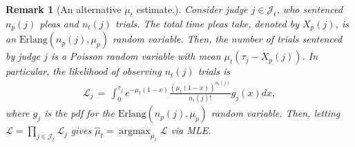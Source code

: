 \documentclass[11pt, oneside]{article}   	%
\theoremstyle{ModifiedStyle}
\newtheorem{remark}{Remark}
\newcommand{\Blue}[1]{\textcolor{blue}{#1}}
\DeclareMathOperator*{\argmax}{argmax}
\begin{document}

\begin{remark}[An alternative $\mu_t$ estimate.]
	Consider judge $j\in\mathcal{J}_t$, who sentenced $n_p(j)$ pleas and $n_t(j)$ trials. The total time pleas take, denoted by $X_p(j)$, is an $\text{Erlang}(n_p(j),\mu_p)$ random variable. Then, the number of trials sentenced by judge $j$ is a Poisson random variable with mean $\mu_t(\tau_j-X_p(j))$. In particular, the likelihood of observing $n_t(j)$ trials is 
	\begin{align*}
		\mathscr{L}_j \,=\, \int_0^{\tau_j} e^{-\mu_t(1-x)} \frac{(\mu_t(1-x))^{n_t(j)}}{n_t(j)!} g_j(x) dx,
	\end{align*} 
	where $g_j$ is the pdf for the $\text{Erlang}(n_p(j),\mu_p)$ random variable. Then, letting $\mathscr{L}=\prod_{j\in\mathcal{J}_t} \mathscr{L}_j$ gives $\hat{\mu}_t=\argmax_{\mu_t} \mathscr{L}$ via MLE.
\end{remark}
\end{document}
